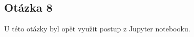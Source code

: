 \documentclass[a4paper,12pt]{article}
\begin{document}
\newpage
\subsection{Otázka 8}
\begin{figure}[h!]
\centering
{}
\end{figure}

U této otázky byl opět využit postup z Jupyter notebooku.
\end{document}
